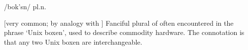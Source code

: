  /bok'sn/ pl.n.

[very common; by analogy with ] Fanciful plural of
 often encountered in the phrase `Unix boxen', used to describe
commodity  hardware. The connotation is that any two Unix boxen
are interchangeable.

